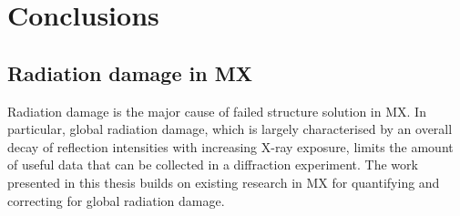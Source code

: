 \chapter{Conclusions}
\label{chap:Conclusions}

\section{Radiation damage in MX}
\label{sec:Radiation damage in MX - conclusion}
Radiation damage is the major cause of failed structure solution in MX.
In particular, global radiation damage, which is largely characterised by an overall decay of reflection intensities with increasing X-ray exposure, limits the amount of useful data that can be collected in a diffraction experiment.
The work presented in this thesis builds on existing research in MX for quantifying and correcting for global radiation damage.

